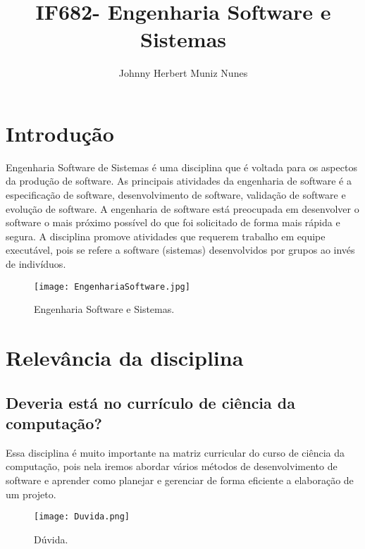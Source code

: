 \documentclass[a4paper,10pt]{article}
\title{IF682- Engenharia Software e Sistemas}
\author{Johnny Herbert Muniz Nunes}
\begin{document}
\maketitle

\section{Introdução}

Engenharia Software de Sistemas é uma disciplina que é voltada para os aspectos
da produção de software. As principais atividades da engenharia de software é a
especificação de software, desenvolvimento de software, validação de software e
evolução de software. A engenharia de software está preocupada em desenvolver o
software o mais próximo possível do que foi solicitado de forma mais rápida e
segura. A disciplina promove atividades que requerem trabalho em equipe executável, pois se refere a software
(sistemas) desenvolvidos por grupos ao invés de indivíduos.\cite{PaginaDisciplina}


\begin{figure}[h]
\centering
\texttt{[image: EngenhariaSoftware.jpg]}
\caption{\label{fig:Engenharia_Software}Engenharia Software e Sistemas.}
\end{figure}


\section{Relevância da disciplina}

\subsection{Deveria está no currículo de ciência da computação?}

Essa disciplina é muito importante na matriz curricular do curso de ciência da computação, pois nela iremos abordar vários métodos de desenvolvimento de software e aprender como planejar e gerenciar de forma eficiente a elaboração de um projeto.

\begin{figure}[b]
\centering
\texttt{[image: Duvida.png]}
\caption{\label{fig:Duvida}Dúvida.}
\end{figure}
\end{document}
